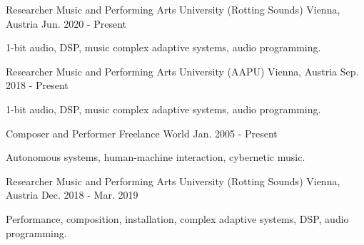 

\begin{cventries}

  \cventry
    {Researcher} %
    {Music and Performing Arts University (Rotting Sounds)} %
    {Vienna, Austria} %
    {Jun. 2020 - Present} %
    {
      \begin{cvitems} %
        \item {1-bit audio, DSP, music complex adaptive systems, audio programming.}
      \end{cvitems}
    }

  \cventry
    {Researcher} %
    {Music and Performing Arts University (AAPU)} %
    {Vienna, Austria} %
    {Sep. 2018 - Present} %
    {
      \begin{cvitems} %
        \item {1-bit audio, DSP, music complex adaptive systems, audio programming.}
      \end{cvitems}
    }

  \cventry
    {Composer and Performer} %
    {Freelance} %
    {World} %
    {Jan. 2005 - Present} %
    {
      \begin{cvitems} %
        \item {Autonomous systems, human-machine interaction, cybernetic music.}
      \end{cvitems}
    }

  \cventry
    {Researcher} %
    {Music and Performing Arts University (Rotting Sounds)} %
    {Vienna, Austria} %
    {Dec. 2018 - Mar. 2019} %
    {
      \begin{cvitems} %
        \item {Performance, composition, installation, complex adaptive systems, DSP, audio programming.}
      \end{cvitems}
    }


\end{cventries}
